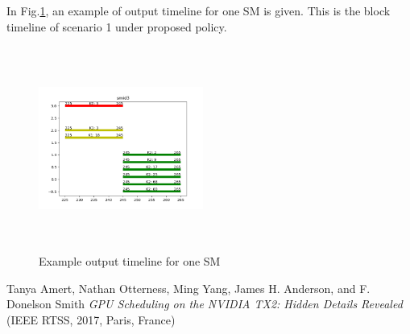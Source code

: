 \documentclass[conference]{IEEEtran}
\begin{document}
In Fig.\ref{fig:example_out}, an example of output timeline for one SM is given. This is the block timeline of scenario 1 under proposed policy.
\begin{figure}[h]
   \centering
   \includegraphics[width=0.48\textwidth, height=190pt]{figs/example1_opt.png}
   \caption{Example output timeline for one SM}
   \label{fig:example_out}
\end{figure}


\begin{thebibliography}{99}
 Tanya Amert, Nathan Otterness, Ming Yang, James H. Anderson, and F. Donelson Smith \emph{GPU Scheduling on the NVIDIA TX2: Hidden Details Revealed} (IEEE RTSS, 2017, Paris, France)
\end{thebibliography}
\end{document}
